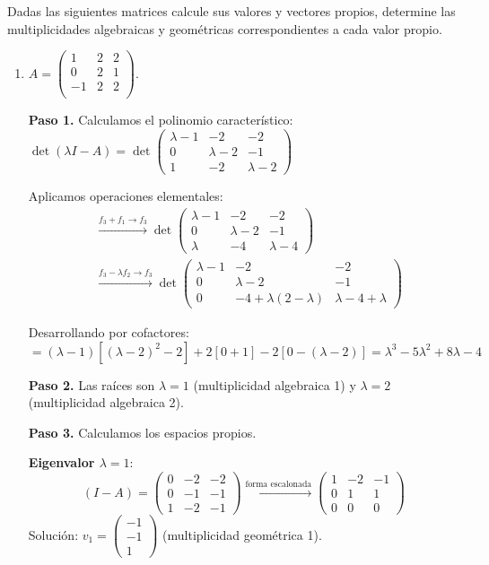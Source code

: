 \begin{example}\label{ex:vvp_multiplicidades} Dadas las siguientes matrices calcule sus valores y vectores propios, determine las multiplicidades algebraicas y geométricas correspondientes a cada valor propio.
  \begin{enumerate}[$a)$]
  \item $A=\left( \begin{array}{ccc} 
	1&2&2 \\
	0&2&1\\
	-1&2&2\\
	\end{array} \right).$ 
\begin{myproof}
\textbf{Paso 1.} Calculamos el polinomio característico: \(
\det(\lambda I - A) = \det\begin{pmatrix}
\lambda-1 & -2 & -2 \\
0 & \lambda-2 & -1 \\
1 & -2 & \lambda-2
\end{pmatrix}
\)

Aplicamos operaciones elementales:
\begin{align*}
& \xrightarrow{f_3 + f_1 \to f_3} \det\begin{pmatrix}
\lambda-1 & -2 & -2 \\
0 & \lambda-2 & -1 \\
\lambda & -4 & \lambda-4
\end{pmatrix} \\
& \xrightarrow{f_3 - \lambda f_2 \to f_3} \det\begin{pmatrix}
\lambda-1 & -2 & -2 \\
0 & \lambda-2 & -1 \\
0 & -4 + \lambda(2-\lambda) & \lambda-4 + \lambda
\end{pmatrix}
\end{align*}

Desarrollando por cofactores:
\[
= (\lambda-1)\left[(\lambda-2)^2 - 2\right] + 2\left[0 + 1\right] - 2\left[0 - (\lambda-2)\right] = \lambda^3 - 5\lambda^2 + 8\lambda - 4
\]

\textbf{Paso 2.} Las raíces son $\lambda = 1$ (multiplicidad algebraica 1) y $\lambda = 2$ (multiplicidad algebraica 2).

\textbf{Paso 3.} Calculamos los espacios propios.

\textbf{Eigenvalor $\lambda=1$}:
\[
( I - A) = \begin{pmatrix}
0 & -2 & -2 \\
0 & -1 & -1 \\
1 & -2 & -1
\end{pmatrix} \xrightarrow{\text{forma escalonada}} \begin{pmatrix}
1 & -2 & -1 \\
0 & 1 & 1 \\
0 & 0 & 0
\end{pmatrix}
\]
Solución: $v_1 = \begin{pmatrix} -1 \\ -1 \\ 1 \end{pmatrix}$ (multiplicidad geométrica 1).


\end{myproof}
\end{enumerate}
\end{example}
